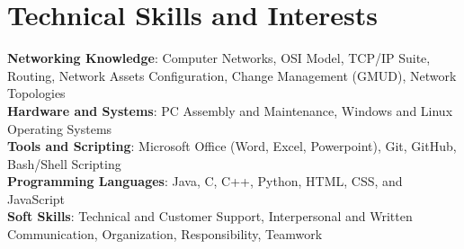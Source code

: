 \documentclass[a4paper,11pt]{article}
\begin{document}
\section{\textbf{Technical Skills and Interests}}
\begin{itemize}[leftmargin=0.05in, label={}]
    \small{\item{
     \textbf{Networking Knowledge}{: Computer Networks, OSI Model, TCP/IP Suite, Routing, Network Assets Configuration, Change Management (GMUD), Network Topologies} \\ [1.5pt]
     \textbf{Hardware and Systems}{: PC Assembly and Maintenance, Windows and Linux Operating Systems} \\ [1.5pt]
     \textbf{Tools and Scripting}{: Microsoft Office (Word, Excel, Powerpoint), Git, GitHub, Bash/Shell Scripting} \\ [1.5pt]
     \textbf{Programming Languages}{: Java, C, C++, Python, HTML, CSS, and JavaScript} \\ [1.5pt]
     \textbf{Soft Skills}{: Technical and Customer Support, Interpersonal and Written Communication, Organization, Responsibility, Teamwork}
    }}
\end{itemize}
\vspace{-16pt}
\end{document}
